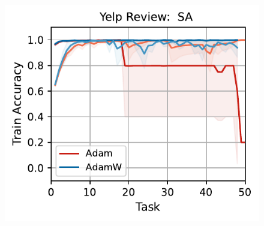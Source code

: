 \begin{figure}[t]
{        \includegraphics[width=\textwidth]{figs/Accuracy/nlp/attention/yelp_review_full_40.pdf}
    }
    \\
\end{figure}
